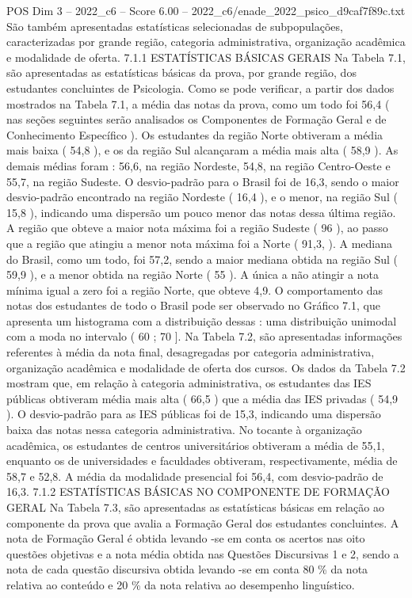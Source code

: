 \begin{textsample}{POS Dim 3 – 2022\_c6 – Score 6.00 – 2022\_c6/enade\_2022\_psico\_d9caf7f89c.txt}
São também apresentadas estatísticas selecionadas de subpopulações, caracterizadas por grande região, categoria administrativa, organização acadêmica e modalidade de oferta. 7.1.1 ESTATÍSTICAS BÁSICAS GERAIS Na Tabela 7.1, são apresentadas as estatísticas básicas da prova, por grande região, dos estudantes concluintes de Psicologia.
Como se pode verificar, a partir dos dados mostrados na Tabela 7.1, a média das notas da prova, como um todo foi 56,4 ( nas seções seguintes serão analisados os Componentes de Formação Geral e de Conhecimento Específico ).
Os estudantes da região Norte obtiveram a média mais baixa ( 54,8 ), e os da região Sul alcançaram a média mais alta ( 58,9 ).
As demais médias foram : 56,6, na região Nordeste, 54,8, na região Centro-Oeste e 55,7, na região Sudeste.
O desvio-padrão para o Brasil foi de 16,3, sendo o maior desvio-padrão encontrado na região Nordeste ( 16,4 ), e o menor, na região Sul ( 15,8 ), indicando uma dispersão um pouco menor das notas dessa última região.
A região que obteve a maior nota máxima foi a região Sudeste ( 96 ), ao passo que a região que atingiu a menor nota máxima foi a Norte ( 91,3, ).
A mediana do Brasil, como um todo, foi 57,2, sendo a maior mediana obtida na região Sul ( 59,9 ), e a menor obtida na região Norte ( 55 ).
A única a não atingir a nota mínima igual a zero foi a região Norte, que obteve 4,9.
O comportamento das notas dos estudantes de todo o Brasil pode ser observado no Gráfico 7.1, que apresenta um histograma com a distribuição dessas : uma distribuição unimodal com a moda no intervalo ( 60 ; 70 ].
Na Tabela 7.2, são apresentadas informações referentes à média da nota final, desagregadas por categoria administrativa, organização acadêmica e modalidade de oferta dos cursos.
Os dados da Tabela 7.2 mostram que, em relação à categoria administrativa, os estudantes das IES públicas obtiveram média mais alta ( 66,5 ) que a média das IES privadas ( 54,9 ).
O desvio-padrão para as IES públicas foi de 15,3, indicando uma dispersão baixa das notas nessa categoria administrativa.
No tocante à organização acadêmica, os estudantes de centros universitários obtiveram a média de 55,1, enquanto os de universidades e faculdades obtiveram, respectivamente, média de 58,7 e 52,8.
A média da modalidade presencial foi 56,4, com desvio-padrão de 16,3. 7.1.2 ESTATÍSTICAS BÁSICAS NO COMPONENTE DE FORMAÇÃO GERAL Na Tabela 7.3, são apresentadas as estatísticas básicas em relação ao componente da prova que avalia a Formação Geral dos estudantes concluintes.
A nota de Formação Geral é obtida levando -se em conta os acertos nas oito questões objetivas e a nota média obtida nas Questões Discursivas 1 e 2, sendo a nota de cada questão discursiva obtida levando -se em conta 80 \% da nota relativa ao conteúdo e 20 \% da nota relativa ao desempenho linguístico.

\end{textsample}
